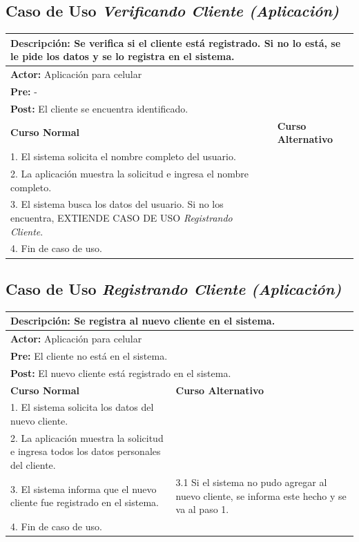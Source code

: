 \documentclass[a4paper]{article}
\begin{document}
\subsection{Caso de Uso \textit{Verificando Cliente (Aplicaci\'on)}}
\begin{center}
\begin{tabular}{|p{10cm} | p{6cm}|}
\hline
\multicolumn{2}{|p{16cm}|}{\textbf{Descripci\'on:} Se verifica si el cliente est\'a registrado. Si no lo est\'a, se le pide los datos y se lo registra en el sistema.} \\
\hline
\multicolumn{2}{|l|}{\textbf{Actor:} Aplicaci\'on para celular} \\
\hline
\multicolumn{2}{|l|}{\textbf{Pre:} -} \\
\hline
\multicolumn{2}{|p{14cm}|}{\textbf{Post:} El cliente se encuentra identificado.}\\
\hline
\textbf{Curso Normal}  & \textbf{Curso Alternativo} \\ \hline
1. El sistema solicita el nombre completo del usuario. & \\ \hline
2. La aplicaci\'on muestra la solicitud e ingresa el nombre completo. & \\ \hline
3. El sistema busca los datos del usuario. Si no los encuentra, EXTIENDE CASO DE USO \textit{Registrando Cliente}. & \\ \hline
4. Fin de caso de uso. & \\ \hline
\end{tabular}
\end{center}

\subsection{Caso de Uso \textit{Registrando Cliente (Aplicaci\'on)}}
\begin{center}
\begin{tabular}{|p{10cm} | p{6cm}|}
\hline
\multicolumn{2}{|p{16cm}|}{\textbf{Descripci\'on:} Se registra al nuevo cliente en el sistema.} \\
\hline
\multicolumn{2}{|l|}{\textbf{Actor:} Aplicaci\'on para celular} \\
\hline
\multicolumn{2}{|l|}{\textbf{Pre:} El cliente no est\'a en el sistema.} \\
\hline
\multicolumn{2}{|p{14cm}|}{\textbf{Post:} El nuevo cliente est\'a registrado en el sistema.}\\
\hline
\textbf{Curso Normal}  & \textbf{Curso Alternativo} \\ \hline
1. El sistema solicita los datos del nuevo cliente. & \\ \hline
2. La aplicaci\'on muestra la solicitud e ingresa todos los datos personales del cliente. & \\ \hline
3. El sistema informa que el nuevo cliente fue registrado en el sistema. & 3.1 Si el sistema no pudo agregar al nuevo cliente, se informa este hecho y se va al paso 1. \\ \hline
4. Fin de caso de uso. & \\ \hline
\end{tabular}
\end{center}
\end{document}
